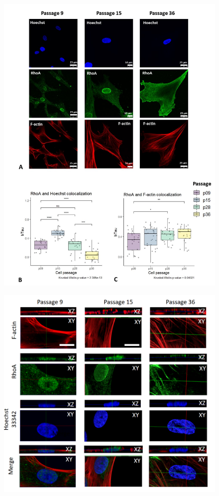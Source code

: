 \documentclass[alpha-refs]{wiley-article}
\begin{document}
\begin{figure}[hbt!]
  \includegraphics[width=0.9\linewidth]{rho.jpg}
  \caption{}
  \centering
\end{figure}

\begin{figure}[hbt!]
  \includegraphics[width=0.9\linewidth]{rho-3d.png}
  \caption{}
  \centering
\end{figure}
\end{document}
